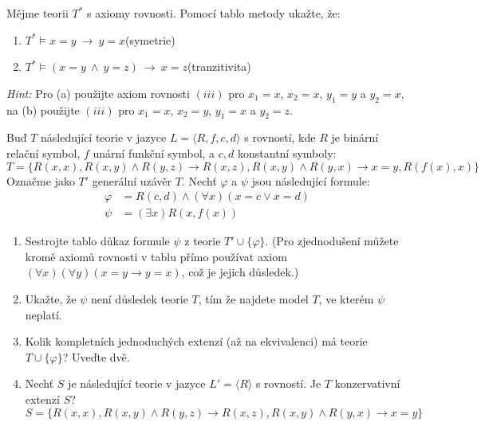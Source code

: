 \documentclass[a4paper,12pt]{article}
\begin{document}
\medskip\begin{problem} Mějme teorii $T^*$ s axiomy rovnosti. Pomocí tablo metody ukažte, že:
\begin{enumerate} 
    \item $T^*\models x=y\ \to\ y=x$\hfill(symetrie)
    \item $T^*\models (x=y\ \wedge\ y=z)\ \to\ x=z$\hfill(tranzitivita)
\end{enumerate}
{\it Hint:} Pro (a) použijte axiom rovnosti $(iii)$ pro $x_1=x$, $x_2=x$, $y_1=y$ a $y_2=x$, \newline
    na (b) použijte $(iii)$ pro $x_1=x$, $x_2=y$, $y_1=x$ a $y_2=z$.
\end{problem}


\medskip\begin{problem} 
Buď $T$ následující teorie v jazyce $L=\langle R,f,c,d\rangle$ s rovností, kde $R$ je binární relační symbol,  $f$ unární funkční symbol, a $c,d$ konstantní symboly:
$$
T=\{R(x,x),R(x,y)\wedge R(y,z)\to R(x,z),R(x,y)\wedge R(y,x)\to x=y,R(f(x),x)\}
$$
Označme jako $T'$ generální uzávěr $T$. Nechť $\varphi$ a $\psi$ jsou následující formule:
\begin{align*}
    \varphi &= R(c,d) \wedge (\forall x)(x=c\vee x=d)\\
    \psi &= (\exists x)R(x,f(x))
\end{align*}
\begin{enumerate}
    \item Sestrojte tablo důkaz formule $\psi$ z teorie $T'\cup\{\varphi\}$. (Pro zjednodušení můžete kromě axiomů rovnosti v tablu přímo používat axiom $(\forall x)(\forall y)(x=y\to y=x)$, což je jejich důsledek.)
    \item Ukažte, že $\psi$ není důsledek teorie $T$, tím že najdete model $T$, ve kterém $\psi$ neplatí.
    \item Kolik kompletních jednoduchých extenzí (až na ekvivalenci) má teorie $T\cup \{\varphi\}$? Uveďte dvě.
    \item Nechť $S$ je následující teorie v jazyce $L'=\langle R\rangle$ s rovností. Je $T$ konzervativní extenzí $S$?
     $$S=\{R(x,x),R(x,y)\wedge R(y,z)\to R(x,z),R(x,y)\wedge R(y,x)\to x=y\}$$     
\end{enumerate}
\end{problem}
\end{document}
